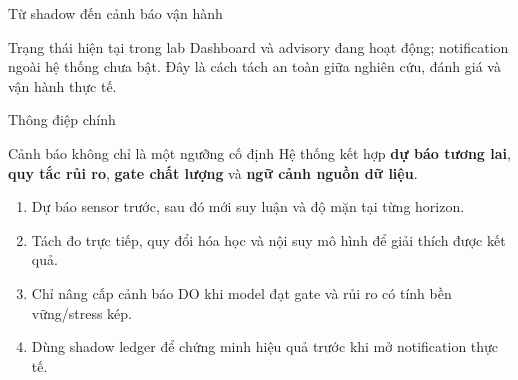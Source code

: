 \begin{frame}{Từ shadow đến cảnh báo vận hành}
  \begin{center}
  \end{center}
  \begin{block}{Trạng thái hiện tại trong lab}
    Dashboard và advisory đang hoạt động; notification ngoài hệ thống chưa bật.
    Đây là cách tách an toàn giữa nghiên cứu, đánh giá và vận hành thực tế.
  \end{block}
\end{frame}

\begin{frame}{Thông điệp chính}
  \begin{alertblock}{Cảnh báo không chỉ là một ngưỡng cố định}
    Hệ thống kết hợp \textbf{dự báo tương lai}, \textbf{quy tắc rủi ro},
    \textbf{gate chất lượng} và \textbf{ngữ cảnh nguồn dữ liệu}.
  \end{alertblock}
  \begin{enumerate}
    \item Dự báo sensor trước, sau đó mới suy luận \DO{} và độ mặn tại từng horizon.
    \item Tách đo trực tiếp, quy đổi hóa học và nội suy mô hình để giải thích được kết quả.
    \item Chỉ nâng cấp cảnh báo DO khi model đạt gate và rủi ro có tính bền vững/stress kép.
    \item Dùng shadow ledger để chứng minh hiệu quả trước khi mở notification thực tế.
  \end{enumerate}
\end{frame}
